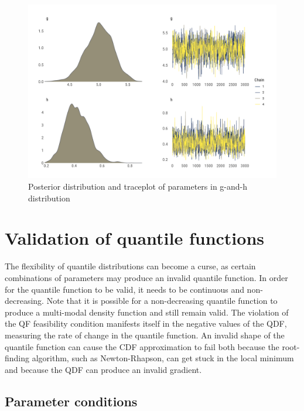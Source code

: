 \documentclass[
  12pt,
]{article}
\begin{document}
\begin{figure}

{\centering \includegraphics[width=0.8\linewidth]{ilbm_article_files/figure-latex/gnh-combo-graph-1} 

}

\caption{Posterior distribution and traceplot of parameters in g-and-h distribution}\label{fig:gnh-combo-graph}
\end{figure}

\hypertarget{validation-of-quantile-functions}{%
\section{Validation of quantile functions}\label{validation-of-quantile-functions}}

The flexibility of quantile distributions can become a curse, as certain combinations of parameters may produce an invalid quantile function. In order for the quantile function to be valid, it needs to be continuous and non-decreasing. Note that it is possible for a non-decreasing quantile function to produce a multi-modal density function and still remain valid. The violation of the QF feasibility condition manifests itself in the negative values of the QDF, measuring the rate of change in the quantile function. An invalid shape of the quantile function can cause the CDF approximation to fail both because the root-finding algorithm, such as Newton-Rhapson, can get stuck in the local minimum and because the QDF can produce an invalid gradient.

\hypertarget{parameter-conditions}{%
\subsection{Parameter conditions}\label{parameter-conditions}}
\end{document}
